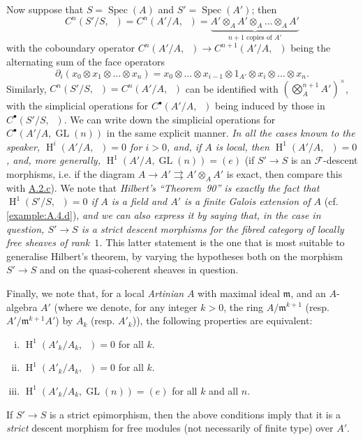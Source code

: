 \documentclass{article}
\theoremstyle{plain}
\theoremstyle{definition}
\newenvironment{example}[1]
  {\renewcommand\theinnercustomexample{#1}\innercustomexample}
  {\endinnercustomexample}
\newcommand{\sh}[1]{{\mathscr{#1}}}
\newcommand{\fk}[1]{{\mathfrak{#1}}}
\DeclareMathOperator{\HH}{H}
\DeclareMathOperator{\GL}{GL}
\DeclareMathOperator{\Ga}{G_a}
\DeclareMathOperator{\Gm}{G_m}
\DeclareMathOperator{\Spec}{Spec}
\newcommand{\oldpage}[1]{\marginpar{\footnotesize$\Big\vert$ \textit{p.~#1}}}
\begin{document}
\begin{example}{2}
  Now suppose that $S=\Spec(A)$ and $S'=\Spec(A')$;
  then
  \[
    C^n(S'/S,\Ga)
    = C^n(A'/A,\Ga)
    = \underbrace{A'\otimes_A A'\otimes_A\ldots\otimes_A A'}_{\mbox{$n+1$ copies of $A'$}}
  \]
  with the coboundary operator $C^n(A'/A,\Ga)\to C^{n+1}(A'/A,\Ga)$ being the alternating sum of the face operators
  \[
    \partial_i(x_0\otimes x_1\otimes\ldots\otimes x_n)
    = x_0\otimes\ldots\otimes x_{i-1}\otimes1_{A'}\otimes x_i\otimes\ldots\otimes x_n.
  \]
  Similarly, $C^n(S'/S,\Gm)=C^n(A'/A,\Gm)$ can be identified with $(\bigotimes_A^{n+1}A')^\times$, with the simplicial operations for $C^\bullet(A'/A,\Gm)$ being induced by those in $C^\bullet(S'/S,\Ga)$.
  We can write down the simplicial operations for $C^\bullet(A'/A,\GL(n))$ in the same explicit manner.
  \emph{In all the cases known to the speaker, $\HH^i(A'/A,\Ga)=0$ for $i>0$, and, if $A$ is local, then $\HH^1(A'/A,\Gm)=0$, and, more generally, $\HH^1(A'/A,\GL(n))=(e)$} (if $S'\to S$ is an $\sh{F}$-descent morphisms, i.e. if the diagram $A\to A'\rightrightarrows A'\otimes_A A'$ is exact, then compare this with \hyperref[A.2.c]{A.2.c}).
  We note that \emph{Hilbert's ``Theorem~90'' is exactly the fact that}
\oldpage{190-16}
  \emph{$\HH^1(S'/S,\Gm)=0$ if $A$ is a field and $A'$ is a finite Galois extension of $A$} (cf. \cref{example:A.4.d}), \emph{and we can also express it by saying that, in the case in question, $S'\to S$ is a strict descent morphisms for the fibred category of locally free sheaves of rank~$1$.}
  This latter statement is the one that is most suitable to generalise Hilbert's theorem, by varying the hypotheses both on the morphism $S'\to S$ and on the quasi-coherent sheaves in question.

  Finally, we note that, for a local \emph{Artinian} $A$ with maximal ideal $\fk{m}$, and an $A$-algebra $A'$ (where we denote, for any integer $k>0$, the ring $A/\fk{m}^{k+1}$ (resp. $A'/\fk{m}^{k+1}A'$) by $A_k$ (resp. $A'_k$)), the following properties are equivalent:
  \begin{enumerate}[(i)]
    \item $\HH^1(A'_k/A_k,\Ga)=0$ for all $k$.
    \item $\HH^1(A'_k/A_k,\Gm)=0$ for all $k$.
    \item $\HH^1(A'_k/A_k,\GL(n))=(e)$ for all $k$ and all $n$.
  \end{enumerate}

  If $S'\to S$ is a strict epimorphism, then the above conditions imply that it is a \emph{strict} descent morphism for free modules (not necessarily of finite type) over $A'$.
\end{example}
\end{document}

